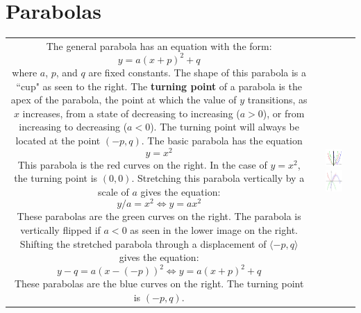 \documentclass{article}
\begin{document}
\section*{Parabolas}

\begin{tabular}{cc}
\parbox{0.5\textwidth}{
The general parabola has an equation with the form:
\[y = a(x + p)^2 + q\] 
where \(a\), \(p\), and \(q\) are fixed constants. \\
The shape of this parabola is a ``cup" as seen to the right. The {\bf turning point} of a parabola is the apex of the parabola, the point at which the value of \(y\) transitions, as \(x\) increases, from a state of decreasing to increasing (\(a > 0\)), or from increasing to decreasing (\(a < 0\)). The turning point will always be located at the point \((-p, q)\). \\
The basic parabola has the equation 
\[y = x^2\]
This parabola is the red curves on the right. In the case of \(y = x^2\), the turning point is \((0, 0)\). \\
Stretching this parabola vertically by a scale of \(a\) gives the equation:
\[y/a = x^2 \iff y = a x^2\] 
These parabolas are the green curves on the right. The parabola is vertically flipped if \(a < 0\) as seen in the lower image on the right. \\
Shifting the stretched parabola through a displacement of \(\langle -p, q \rangle\) gives the equation:
\[y - q = a(x - (-p))^2 \iff y = a(x + p)^2 + q\]
These parabolas are the blue curves on the right. The turning point is \((-p, q)\).
} & \parbox{0.5\textwidth}{
\includegraphics[width = 0.5\textwidth]{parabolas_1} \\ 
\includegraphics[width = 0.5\textwidth]{parabolas_2}
}
\end{tabular}
\end{document}
